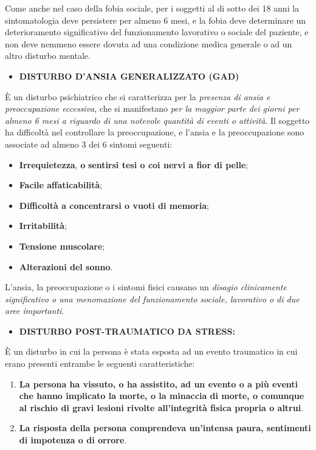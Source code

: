 \documentclass[]{article}
\begin{document}
Come anche nel caso della fobia sociale, per i soggetti al di sotto dei
18 anni la sintomatologia deve persistere per almeno 6 mesi, e la fobia
deve determinare un deterioramento significativo del funzionamento
lavorativo o sociale del paziente, e non deve nemmeno essere dovuta ad
una condizione medica generale o ad un altro disturbo mentale.

\begin{itemize}
\item
  \textbf{DISTURBO D'ANSIA GENERALIZZATO (GAD)}
\end{itemize}

È un disturbo psichiatrico che si caratterizza per la \emph{presenza di
ansia e preoccupazione eccessiva}, che si manifestano \emph{per la
maggior parte dei giorni per almeno 6 mesi a riguardo di una notevole
quantità di eventi o attività}. Il soggetto ha difficoltà nel
controllare la preoccupazione, e l'ansia e la preoccupazione sono
associate ad almeno 3 dei 6 sintomi seguenti:

\begin{itemize}
\item
  \textbf{Irrequietezza}, \textbf{o} \textbf{sentirsi tesi o coi nervi a
  fior di pelle};
\item
  \textbf{Facile affaticabilità};
\item
  \textbf{Difficoltà a concentrarsi o vuoti di memoria};
\item
  \textbf{Irritabilità};
\item
  \textbf{Tensione muscolare};
\item
  \textbf{Alterazioni del sonno}.
\end{itemize}

L'ansia, la preoccupazione o i sintomi fisici causano un \emph{disagio
clinicamente significativo o una menomazione del funzionamento sociale,
lavorativo o di due aree importanti}.

\begin{itemize}
\item
  \textbf{DISTURBO POST-TRAUMATICO DA STRESS:}
\end{itemize}

È un disturbo in cui la persona è stata esposta ad un evento traumatico
in cui erano presenti entrambe le seguenti caratteristiche:

\begin{enumerate}
\def\labelenumi{\arabic{enumi}.}
\item
  \textbf{La persona ha vissuto, o ha assistito, ad un evento o a più
  eventi che hanno implicato la morte, o la minaccia di morte, o
  comunque al rischio di gravi lesioni rivolte all'integrità fisica
  propria o altrui}.
\item
  \textbf{La risposta della persona comprendeva un'intensa paura,
  sentimenti di impotenza o di orrore}.
\end{enumerate}
\end{document}
